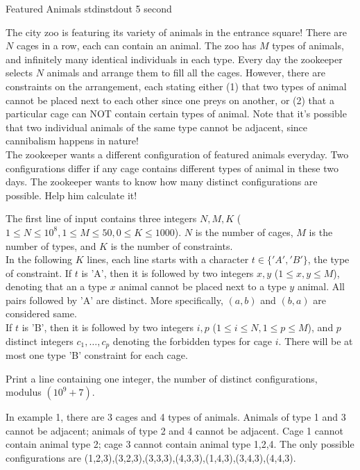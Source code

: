 \begin{problem}{Featured Animals}
{stdin}{stdout}
{5 second}{}{}

The city zoo is featuring its variety of animals in the entrance square! There are $N$ cages in a row, each can contain an animal. The zoo has $M$ types of animals, and infinitely many identical individuals in each type. Every day the zookeeper selects $N$ animals and arrange them to fill all the cages. However, there are constraints on the arrangement, each stating either (1) that two types of animal cannot be placed next to each other since one preys on another, or (2) that a particular cage can NOT contain certain types of animal. Note that it's possible that two individual animals of the same type cannot be adjacent, since cannibalism happens in nature! \\

The zookeeper wants a different configuration of featured animals everyday. Two configurations differ if any cage contains different types of animal in these two days. The zookeeper wants to know how many distinct configurations are possible. Help him calculate it! 

\InputFile

The first line of input contains three integers $N, M, K$ ($1 \le N \le 10^8, 1 \le M \le 50, 0 \le K \le 1000$). $N$ is the number of cages, $M$ is the number of types, and $K$ is the number of constraints. \\
In the following $K$ lines, each line starts with a character $t \in \{'A','B'\}$, the type of constraint. If $t$ is 'A', then it is followed by two integers $x, y$ ($1 \le x, y \le M$), denoting that an a type $x$ animal cannot be placed next to a type $y$ animal. All pairs followed by 'A' are distinct. More specifically, $(a, b)$ and $(b, a)$ are considered same.
\\ If $t$ is 'B', then it is followed by two integers $i, p$ ($1 \le i \le N, 1 \le p \le M$), and $p$ distinct integers $c_1, \hdots, c_p$ denoting the forbidden types for cage $i$. There will be at most one type 'B' constraint for each cage.

\OutputFile

Print a line containing one integer, the number of distinct configurations, modulus $(10^9+7)$. 

\Examples

\begin{example}
%
%
\end{example}

\Notes

In example 1, there are 3 cages and 4 types of animals. Animals of type 1 and 3 cannot be adjacent; animals of type 2 and 4 cannot be adjacent. Cage 1 cannot contain animal type 2; cage 3 cannot contain animal type 1,2,4. The only possible configurations are (1,2,3),(3,2,3),(3,3,3),(4,3,3),(1,4,3),(3,4,3),(4,4,3). 

\end{problem}
